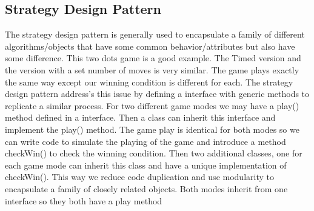 \documentclass[12pt]{article}
\begin{document}
\begin{enumerate}
\subsection*{Strategy Design Pattern}
\noindent The strategy design pattern is generally used to encapsulate a family of different algorithms/objects that have some common behavior/attributes but also have some difference. This two dots game is a good example. The Timed version and the version with a set number of moves is very similar. The game plays exactly the same way except our winning condition is different for each. The strategy design pattern address's this issue by defining a interface with generic methods to replicate a similar process. For two different game modes we may have a play() method defined in a interface. Then a class can inherit this interface and implement the play() method. The game play is identical for both modes so we can write code to simulate the playing of the game and introduce a method checkWin() to check the winning condition. Then two additional classes, one for each game mode can inherit this class and have a unique implementation of checkWin(). This way we reduce code duplication and use modularity to encapsulate a family of closely related objects. Both modes inherit from one interface so they both have a play method


\end{enumerate}
\end{document}
